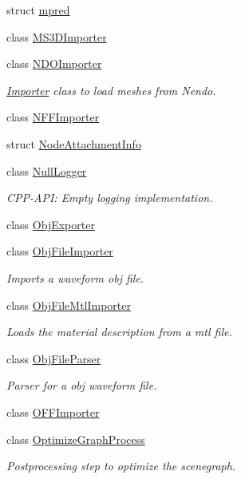 \begin{DoxyCompactItemize}
struct \hyperlink{struct_assimp_1_1mpred}{mpred}
\item 
class \hyperlink{class_assimp_1_1_m_s3_d_importer}{M\+S3\+D\+Importer}
\item 
class \hyperlink{class_assimp_1_1_n_d_o_importer}{N\+D\+O\+Importer}
\begin{DoxyCompactList}\small\item\em \hyperlink{class_assimp_1_1_importer}{Importer} class to load meshes from Nendo. \end{DoxyCompactList}\item 
class \hyperlink{class_assimp_1_1_n_f_f_importer}{N\+F\+F\+Importer}
\item 
struct \hyperlink{struct_assimp_1_1_node_attachment_info}{Node\+Attachment\+Info}
\item 
class \hyperlink{class_assimp_1_1_null_logger}{Null\+Logger}
\begin{DoxyCompactList}\small\item\em C\+P\+P-\/\+A\+P\+I\+: Empty logging implementation. \end{DoxyCompactList}\item 
class \hyperlink{class_assimp_1_1_obj_exporter}{Obj\+Exporter}
\item 
class \hyperlink{class_assimp_1_1_obj_file_importer}{Obj\+File\+Importer}
\begin{DoxyCompactList}\small\item\em Imports a waveform obj file. \end{DoxyCompactList}\item 
class \hyperlink{class_assimp_1_1_obj_file_mtl_importer}{Obj\+File\+Mtl\+Importer}
\begin{DoxyCompactList}\small\item\em Loads the material description from a mtl file. \end{DoxyCompactList}\item 
class \hyperlink{class_assimp_1_1_obj_file_parser}{Obj\+File\+Parser}
\begin{DoxyCompactList}\small\item\em Parser for a obj waveform file. \end{DoxyCompactList}\item 
class \hyperlink{class_assimp_1_1_o_f_f_importer}{O\+F\+F\+Importer}
\item 
class \hyperlink{class_assimp_1_1_optimize_graph_process}{Optimize\+Graph\+Process}
\begin{DoxyCompactList}\small\item\em Postprocessing step to optimize the scenegraph. \end{DoxyCompactList}\item 

\end{DoxyCompactItemize}
